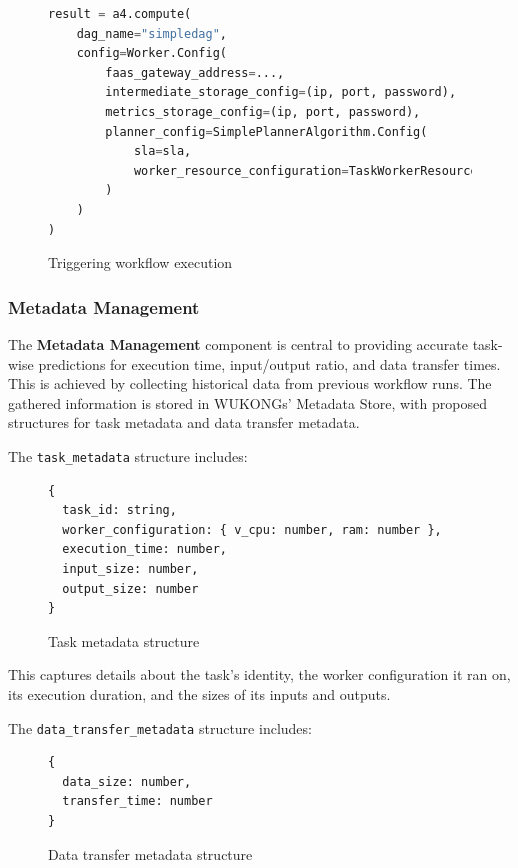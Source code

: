 \documentclass[conference]{IEEEtran}
\begin{document}
\begin{figure}[h]
\centering
\begin{lstlisting}[language=Python, basicstyle=\ttfamily\footnotesize, columns=fullflexible, breaklines=true]
result = a4.compute(
    dag_name="simpledag", 
    config=Worker.Config(
        faas_gateway_address=...,
        intermediate_storage_config=(ip, port, password),
        metrics_storage_config=(ip, port, password),
        planner_config=SimplePlannerAlgorithm.Config(
            sla=sla,
            worker_resource_configuration=TaskWorkerResourceConfiguration(cpus=3, memory_mb=512),
        )
    )
)
\end{lstlisting}
\caption{Triggering workflow execution}
\label{lst:triggering_workflow_execution}
\end{figure}

\subsubsection{Metadata Management}
The \textbf{Metadata Management} component is central to providing accurate task-wise predictions for execution time, input/output ratio, and data transfer times. This is achieved by collecting historical data from previous workflow runs. The gathered information is stored in WUKONGs' Metadata Store, with proposed structures for task metadata and data transfer metadata.

The \texttt{task\_metadata} structure includes:
\begin{figure}[h]
\centering
\begin{lstlisting}[basicstyle=\ttfamily\footnotesize, columns=fullflexible, breaklines=true]
{
  task_id: string,
  worker_configuration: { v_cpu: number, ram: number },
  execution_time: number,
  input_size: number,
  output_size: number
}
\end{lstlisting}
\caption{Task metadata structure}
\label{lst:task_metadata}
\end{figure}

This captures details about the task's identity, the worker configuration it ran on, its execution duration, and the sizes of its inputs and outputs.

The \texttt{data\_transfer\_metadata} structure includes:
\begin{figure}[h]
\centering
\begin{lstlisting}[basicstyle=\ttfamily\footnotesize, columns=fullflexible, breaklines=true]
{
  data_size: number,
  transfer_time: number
}
\end{lstlisting}
\caption{Data transfer metadata structure}
\label{lst:data_transfer_metadata}
\end{figure}
\end{document}
